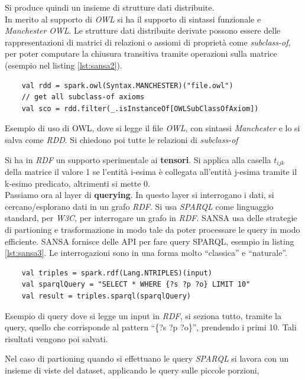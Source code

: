 \documentclass[a4paper,12pt, oneside]{book}
\begin{document}
Si produce quindi un insieme di strutture dati distribuite.\\
In merito al supporto di \textit{OWL} si ha il supporto di sintassi funzionale e
\textit{Manchester OWL}. Le strutture dati distribuite derivate possono essere
delle rappresentazioni di matrici di relazioni o assiomi di proprietà come
\textit{subclass-of}, per poter computare la chiusura transitiva tramite
operazioni sulla matrice (esempio nel listing \ref{lst:sansa2}).
\begin{listing}
  \begin{verbatim}
    val rdd = spark.owl(Syntax.MANCHESTER)("file.owl")
    // get all subclass-of axioms
    val sco = rdd.filter(_.isInstanceOf[OWLSubClassOfAxiom])
  \end{verbatim}
  \caption{Esempio di uso di OWL, dove si legge il file \textit{OWL}, con
    sintassi \textit{Manchester} e lo si salva come \textit{RDD}. Si chiedono
    poi tutte le relazioni di \textit{subclass-of}}
  \label{lst:sansa2}
\end{listing}
Si ha in \textit{RDF} un supporto sperimentale ai \textbf{tensori}. Si applica
alla casella $t_{ijk}$ della matrice il valore 1 se l'entità i-esima è collegata
all'entità j-esima tramite il k-esimo predicato, altrimenti si mette 0. \\
Passiamo ora al layer di \textbf{querying}. In questo layer si interrogano i
dati, si cercano/esplorano dati in un grafo \textit{RDF}. Si usa \textit{SPARQL}
come linguaggio standard, per \textit{W3C}, per interrogare un grafo in
\textit{RDF}. SANSA usa delle strategie di partioning e trasformazione in modo
tale da poter processare le query in modo efficiente. SANSA fornisce delle API
per fare query SPARQL, esempio in listing \ref{lst:sansa3}. Le interrogazioni
sono in una forma molto ``classica'' e ``naturale''.
\begin{listing}
  \begin{verbatim}
    val triples = spark.rdf(Lang.NTRIPLES)(input)
    val sparqlQuery = "SELECT * WHERE {?s ?p ?o} LIMIT 10"
    val result = triples.sparql(sparqlQuery)
  \end{verbatim}
  \caption{Esempio di query dove si legge un input in \textit{RDF}, si seziona
  tutto, tramite la query, quello che corrisponde al pattern ``\{?s ?p ?o\}'',
  prendendo i primi 10. Tali risultati vengono poi salvati.}
  \label{lst:sansa3}
\end{listing}
Nel caso di partioning quando si effettuano le query \textit{SPARQL} si lavora
con un insieme di viste del dataset, applicando le query sulle piccole porzioni,
\end{document}
